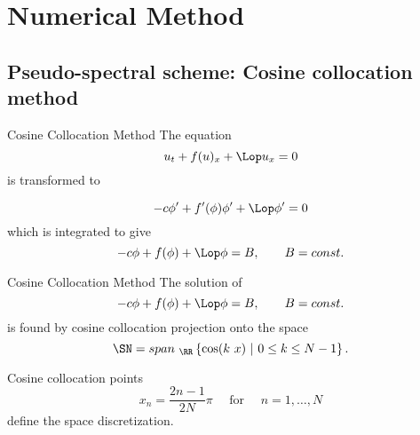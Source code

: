 \section{Numerical Method}
\subsection{Pseudo-spectral scheme: Cosine collocation method}
\begin{frame}[t]{Cosine Collocation Method}
The equation 
	\begin{equation*}
		u_t+ f(u)_x + \Lop u_x = 0 
	\end{equation*}
is transformed to 

	\begin{equation*}
		-c\phi' + f'(\phi)\phi' + \Lop \phi' = 0 
	\end{equation*}
which is integrated to give 
	\begin{equation*}
		-c\phi + f(\phi) + \Lop \phi = B, \qquad B = const. 
	\end{equation*}
\end{frame}
\begin{frame}[t]{Cosine Collocation Method}
The solution of 
	\begin{equation*}
		-c\phi + f(\phi) + \Lop \phi = B, \qquad B = const. 
	\end{equation*}
is found by cosine collocation projection onto the space
	$$
	\SN = span_{~\RR}\left\lbrace \cos(k~x)~|~0 \leq k \leq N-1\right\rbrace.
	$$
\pause

Cosine collocation points $$x_n = \frac{2n-1}{2N}\pi \quad \mbox{ for }\quad n=1, \ldots, N$$
define the space discretization. 
\end{frame}
